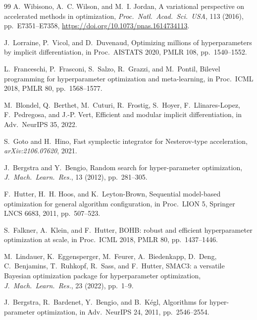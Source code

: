 \documentclass[11pt]{article}
\theoremstyle{definition}
\begin{document}
\begin{thebibliography}{99}
A.~Wibisono, A.~C. Wilson, and M.~I. Jordan,
A variational perspective on accelerated methods in optimization,
\textit{Proc.\ Natl.\ Acad.\ Sci.\ USA}, 113 (2016), pp.~E7351--E7358,
\url{https://doi.org/10.1073/pnas.1614734113}.

J.~Lorraine, P.~Vicol, and D.~Duvenaud,
Optimizing millions of hyperparameters by implicit differentiation,
in Proc.\ AISTATS 2020, PMLR 108, pp.~1540--1552.

L.~Franceschi, P.~Frasconi, S.~Salzo, R.~Grazzi, and M.~Pontil,
Bilevel programming for hyperparameter optimization and meta-learning,
in Proc.\ ICML 2018, PMLR 80, pp.~1568--1577.

M.~Blondel, Q.~Berthet, M.~Cuturi, R.~Frostig, S.~Hoyer,
F.~Llinares-Lopez, F.~Pedregosa, and J.-P. Vert,
Efficient and modular implicit differentiation,
in Adv.\ NeurIPS 35, 2022.

S.~Goto and H.~Hino,
Fast symplectic integrator for Nesterov-type acceleration,
\textit{arXiv:2106.07620}, 2021.

J.~Bergstra and Y.~Bengio,
Random search for hyper-parameter optimization,
\textit{J.\ Mach.\ Learn.\ Res.}, 13 (2012), pp.~281--305.

F.~Hutter, H.~H. Hoos, and K.~Leyton-Brown,
Sequential model-based optimization for general algorithm configuration,
in Proc.\ LION 5, Springer LNCS 6683, 2011, pp.~507--523.

S.~Falkner, A.~Klein, and F.~Hutter,
BOHB: robust and efficient hyperparameter optimization at scale,
in Proc.\ ICML 2018, PMLR 80, pp.~1437--1446.

M.~Lindauer, K.~Eggensperger, M.~Feurer, A.~Biedenkapp,
D.~Deng, C.~Benjamins, T.~Ruhkopf, R.~Sass, and F.~Hutter,
SMAC3: a versatile Bayesian optimization package for hyperparameter
optimization,
\textit{J.\ Mach.\ Learn.\ Res.}, 23 (2022), pp.~1--9.

J.~Bergstra, R.~Bardenet, Y.~Bengio, and B.~K\'{e}gl,
Algorithms for hyper-parameter optimization,
in Adv.\ NeurIPS 24, 2011, pp.~2546--2554.


\end{thebibliography}
\end{document}
